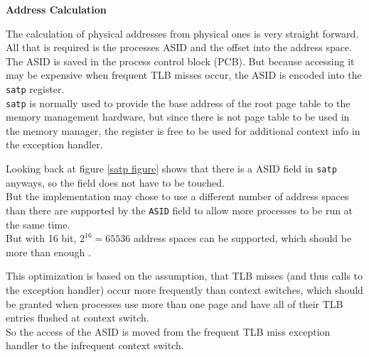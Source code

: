


\textbf{Address Calculation}

The calculation of physical addresses from physical ones is very straight forward. All that is required is the processes ASID and the offset into the address space.\\
The ASID is saved in the process control block (PCB). But because accessing it may be expensive when frequent TLB misses occur, the ASID is encoded into the \texttt{satp} register.\\
\texttt{satp} is normally used to provide the base address of the root page table to the memory management hardware, but since there is not page table to be used in the memory manager, the register is free to be used for additional context info in the exception handler.

Looking back at figure \ref{satp figure} shows that there is a ASID field in \texttt{satp} anyways,
so the  field does not have to be touched.\\
But the implementation may chose to use a different number of address spaces than there are supported by the \texttt{ASID} field to allow more processes to be run at the same time.\\
But with 16 bit, $2^16 = 65536$ address spaces can be supported, which should be more than enough .

This optimization is based on the assumption, that TLB misses (and thus calls to the exception handler) occur more frequently than context switches, which should be granted when processes use more than one page and have all of their TLB entries flushed at context switch.\\
So the access of the ASID is moved from the frequent TLB miss exception handler to the infrequent context switch. %





